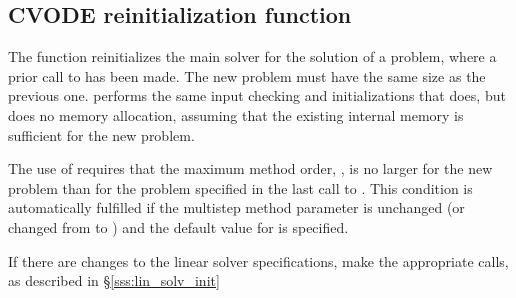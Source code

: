 \subsection{CVODE reinitialization function}\label{sss:cvreinit}

The function  reinitializes the main {\cvode} solver for
the solution of a problem, where a prior call to  has
been made. The new problem must have the same size as the previous one.
 performs the same input checking and initializations 
that  does, but does no memory allocation, assuming that the 
existing internal memory is sufficient for the new problem.             
                                                                 
The use of  requires that the maximum method order,    
, is no larger for the new problem than for the problem  
specified in the last call to .  This condition is  
automatically fulfilled if the multistep method parameter   
is unchanged (or changed from  to ) and the default    
value for  is specified.

If there are changes to the linear solver specifications, make the
appropriate  calls, as described in \S\ref{sss:lin_solv_init}

